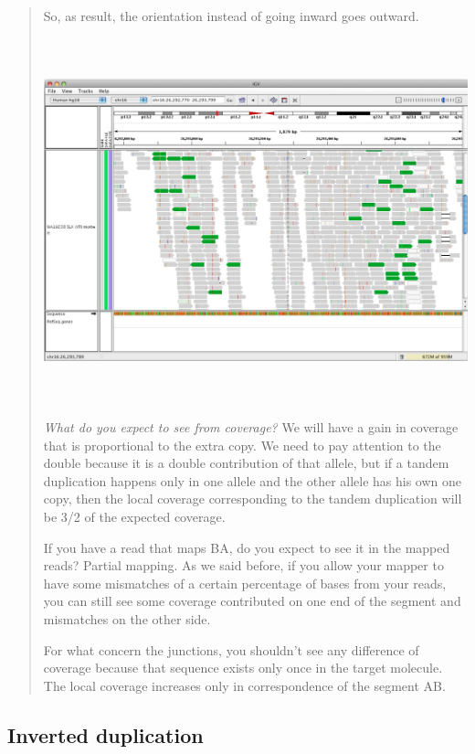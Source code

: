 \begin{quote}
So, as result, the orientation instead of going inward goes outward.

\includegraphics[width=6.22598in,height=4.14375in]{image24.jpeg}

\emph{What do you expect to see from coverage?} We will have a gain in
coverage that is proportional to the extra copy. We need to pay
attention to the double because it is a double contribution of that
allele, but if a tandem duplication happens only in one allele and the
other allele has his own one copy, then the local coverage corresponding
to the tandem duplication will be 3/2 of the expected coverage.

If you have a read that maps BA, do you expect to see it in the mapped
reads? Partial mapping. As we said before, if you allow your mapper to
have some mismatches of a certain percentage of bases from your reads,
you can still see some coverage contributed on one end of the segment
and mismatches on the other side.

For what concern the junctions, you shouldn't see any difference of
coverage because that sequence exists only once in the target molecule.
The local coverage increases only in correspondence of the segment AB.
\end{quote}

\hypertarget{inverted-duplication}{%
\subsection{Inverted duplication}\label{inverted-duplication}}

